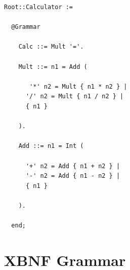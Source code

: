 \documentclass{article}
\begin{document}
\begin{verbatim}
Root::Calculator :=
  
  @Grammar
    
    Calc ::= Mult '='.
      
    Mult ::= n1 = Add (
      
       '*' n2 = Mult { n1 * n2 } |
      '/' n2 = Mult { n1 / n2 } |
      { n1 }
        
    ).
      
    Add ::= n1 = Int (
      
      '+' n2 = Add { n1 + n2 } |
      '-' n2 = Add { n1 - n2 } |
      { n1 }
        
    ).
      
  end;
\end{verbatim}

\section{XBNF Grammar}

\label{XBNFGrammar}
\end{document}
